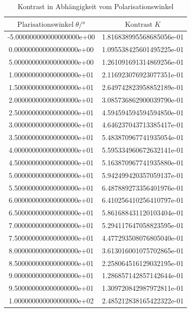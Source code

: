 \begin{table}
 \centering
 \begin{tabular}{S S[round-mode = places , round-precision = 2,scientific-notation=fixed, fixed-exponent = 0]}
   \toprule
    $\text{Plarisationswinkel} \; \theta / \si{\degree}$ &
    $\text{Kontrast} \; K $\\
   \midrule
	-5.000000000000000000e+00 & 1.816838995568685056e-01\\
	0.000000000000000000e+00 & 1.095538425601495225e-01\\
	5.000000000000000000e+00 & 1.261091691314869256e-01\\
	1.000000000000000000e+01 & 2.116923076923077351e-01\\
	1.500000000000000000e+01 & 2.649742823958852189e-01\\
	2.000000000000000000e+01 & 3.085736862900039790e-01\\
	2.500000000000000000e+01 & 4.594594594594594850e-01\\
	3.000000000000000000e+01 & 4.646237043713385417e-01\\
	3.500000000000000000e+01 & 5.483870967741935054e-01\\
	4.000000000000000000e+01 & 5.595334960672632141e-01\\
	4.500000000000000000e+01 & 5.163870967741935880e-01\\
	5.000000000000000000e+01 & 5.942499420357059137e-01\\
	5.500000000000000000e+01 & 6.487889273356401976e-01\\
	6.000000000000000000e+01 & 6.410256410256410797e-01\\
	6.500000000000000000e+01 & 5.861688431120103404e-01\\
	7.000000000000000000e+01 & 5.294117647058823595e-01\\
	7.500000000000000000e+01 & 4.477293508076805040e-01\\
	8.000000000000000000e+01 & 3.613016001075702865e-01\\
	8.500000000000000000e+01 & 2.258064516129032195e-01\\
	9.000000000000000000e+01 & 1.286857142857142644e-01\\
	9.500000000000000000e+01 & 1.309720842987972811e-01\\
	1.000000000000000000e+02 & 2.485212838165422322e-01\\
   \bottomrule
 \end{tabular}
 \caption{Kontrast in Abhängigkeit vom Polarisationswinkel}
 \label{tab:KP}
\end{table}

